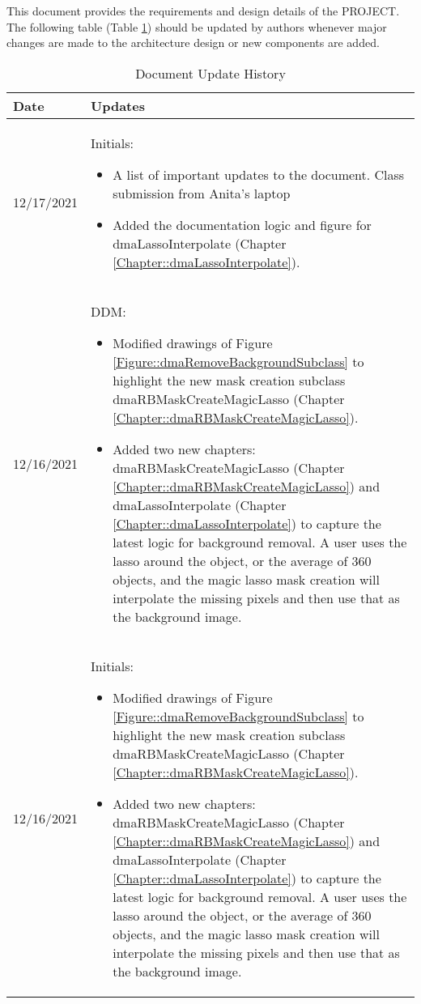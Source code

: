 This document provides the requirements and design details of the
PROJECT.  The following table (Table \ref{Table::UpdateHistory}) should be
updated by authors whenever major changes are made to the architecture
design or new components are added.  

\begin{longtable}{|l||p{13.5cm}|}
\caption{Document Update History \label{Table::UpdateHistory}}\\
\hline
\textbf{Date} & \textbf{Updates} \\
\hline 
\endhead

12/17/2021 & Initials:
\begin{itemize}[topsep=0pt,itemsep=0pt,parsep=0pt,partopsep=0pt,leftmargin=12pt]
\item A list of important updates to the document. Class submission from Anita's laptop
\item Added the documentation logic and figure for dmaLassoInterpolate 
(Chapter \ref{Chapter::dmaLassoInterpolate}). 
\end{itemize} 
\\ \hline

12/16/2021 & DDM:
\begin{itemize}[topsep=0pt,itemsep=0pt,parsep=0pt,partopsep=0pt,leftmargin=12pt]
\item Modified drawings of Figure \ref{Figure::dmaRemoveBackgroundSubclass} to
highlight the new mask creation subclass dmaRBMaskCreateMagicLasso (Chapter 
\ref{Chapter::dmaRBMaskCreateMagicLasso}).
\item Added two new chapters: dmaRBMaskCreateMagicLasso
(Chapter \ref{Chapter::dmaRBMaskCreateMagicLasso}) and dmaLassoInterpolate
(Chapter \ref{Chapter::dmaLassoInterpolate}) to capture the latest logic for 
background removal.  A user uses the lasso around the object, or the average 
of 360 objects, and the magic lasso mask creation will interpolate the missing
pixels and then use that as the background image. 
\end{itemize} 
\\ \hline

12/16/2021 & Initials:
\begin{itemize}[topsep=0pt,itemsep=0pt,parsep=0pt,partopsep=0pt,leftmargin=12pt]
\item Modified drawings of Figure \ref{Figure::dmaRemoveBackgroundSubclass} to
highlight the new mask creation subclass dmaRBMaskCreateMagicLasso (Chapter 
\ref{Chapter::dmaRBMaskCreateMagicLasso}).
\item Added two new chapters: dmaRBMaskCreateMagicLasso
(Chapter \ref{Chapter::dmaRBMaskCreateMagicLasso}) and dmaLassoInterpolate
(Chapter \ref{Chapter::dmaLassoInterpolate}) to capture the latest logic for 
background removal.  A user uses the lasso around the object, or the average 
of 360 objects, and the magic lasso mask creation will interpolate the missing
pixels and then use that as the background image. 
\end{itemize} 
\\ \hline


\end{longtable}
